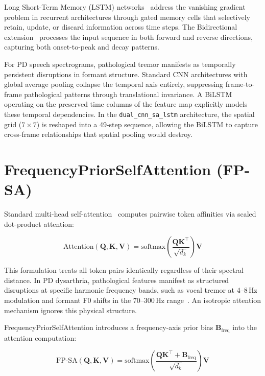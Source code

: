 \documentclass[oneside,openany]{final_report}
\newcommand{\dualcnn}{\texttt{dual\_cnn\_sa\_lstm}}
\begin{document}
Long Short-Term Memory (LSTM) networks~\cite{hochreiter1997} address the vanishing gradient problem in recurrent architectures through gated memory cells that selectively retain, update, or discard information across time steps. The Bidirectional extension~\cite{graves2005} processes the input sequence in both forward and reverse directions, capturing both onset-to-peak and decay patterns.

For PD speech spectrograms, pathological tremor manifests as temporally persistent disruptions in formant structure. Standard CNN architectures with global average pooling collapse the temporal axis entirely, suppressing frame-to-frame pathological patterns through translational invariance. A BiLSTM operating on the preserved time columns of the feature map explicitly models these temporal dependencies. In the \dualcnn{} architecture, the spatial grid ($7 \times 7$) is reshaped into a 49-step sequence, allowing the BiLSTM to capture cross-frame relationships that spatial pooling would destroy.

\section{FrequencyPriorSelfAttention (FP-SA)}
\label{sec:fpsa_theory}

Standard multi-head self-attention~\cite{vaswani2017} computes pairwise token affinities via scaled dot-product attention:

\begin{equation}
    \text{Attention}(\mathbf{Q}, \mathbf{K}, \mathbf{V}) = \text{softmax}\!\left(\frac{\mathbf{Q}\mathbf{K}^\top}{\sqrt{d_k}}\right) \mathbf{V}
    \label{eq:standard_attn}
\end{equation}

This formulation treats all token pairs identically regardless of their spectral distance. In PD dysarthria, pathological features manifest as structured disruptions at specific harmonic frequency bands, such as vocal tremor at 4--8\,Hz modulation and formant F0 shifts in the 70--300\,Hz range~\cite{rusz2011}. An isotropic attention mechanism ignores this physical structure.

FrequencyPriorSelfAttention introduces a frequency-axis prior bias $\mathbf{B}_{\text{freq}}$ into the attention computation:

\begin{equation}
    \text{FP-SA}(\mathbf{Q}, \mathbf{K}, \mathbf{V}) = \text{softmax}\!\left(\frac{\mathbf{Q}\mathbf{K}^\top + \mathbf{B}_{\text{freq}}}{\sqrt{d_k}}\right) \mathbf{V}
    \label{eq:fpsa}
\end{equation}
\end{document}
